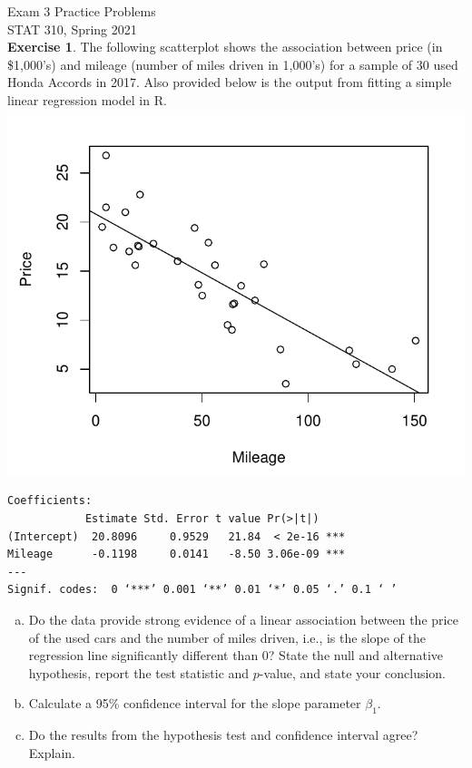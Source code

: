 \documentclass[10pt]{article}\usepackage[]{graphicx}\usepackage[]{color}
\begin{document}
\setlength\parindent{0pt}

Exam 3 Practice Problems\\
STAT 310, Spring 2021\\

\textbf{Exercise 1}.  The following scatterplot shows the association between price (in \$1,000's) and mileage (number of miles driven in 1,000's) for a sample of 30 used Honda Accords in 2017.  Also provided below is the output from fitting a simple linear regression model in R.\\

\includegraphics[scale=0.4]{figure/scatter_cars.pdf}

\begin{verbatim}
Coefficients:
            Estimate Std. Error t value Pr(>|t|)    
(Intercept)  20.8096     0.9529   21.84  < 2e-16 ***
Mileage      -0.1198     0.0141   -8.50 3.06e-09 ***
---
Signif. codes:  0 ‘***’ 0.001 ‘**’ 0.01 ‘*’ 0.05 ‘.’ 0.1 ‘ ’ 
\end{verbatim}

\medskip

\begin{enumerate}[(a)]
\item Do the data provide strong evidence of a linear association between the price of the used cars and the number of miles driven, i.e., is the slope of the regression line significantly different than 0? State the null and alternative hypothesis, report the test statistic and $p$-value, and state your conclusion. 
\vspace{3cm}
\item Calculate a 95\% confidence interval for the slope parameter $\beta_1$.
\vspace{4cm}
\item Do the results from the hypothesis test and confidence interval agree?  Explain.
\end{enumerate}
\end{document}
